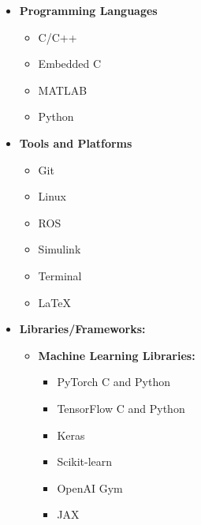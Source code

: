 \documentclass[12pt]{article}
\begin{document}
\begin{itemize}
	\item \textbf{Programming Languages}
	\begin{multicols}{4}
		\begin{itemize}
			\item C/C++
			\item Embedded C
			\item MATLAB
			\item Python \faPython
		\end{itemize}
	\end{multicols}
	\item \textbf{Tools and Platforms}	
	\begin{multicols}{3}
		\begin{itemize}
			\item Git \faGitSquare
			\item Linux \faLinux
			\item ROS
			\item Simulink
			\item Terminal \faTerminal
			\item \LaTeX
		\end{itemize}
	\end{multicols}
	\item \textbf{Libraries/Frameworks:} 
	\begin{itemize}
		\item \textbf{Machine Learning Libraries:}
		\begin{multicols}{2}
			\begin{itemize}
				\item PyTorch C and Python
				\item TensorFlow C and Python
				\item Keras
				\item Scikit-learn
				\item OpenAI Gym
				\item JAX
			\end{itemize}
		\end{multicols}
	

\end{itemize}
\end{itemize}
\end{document}
